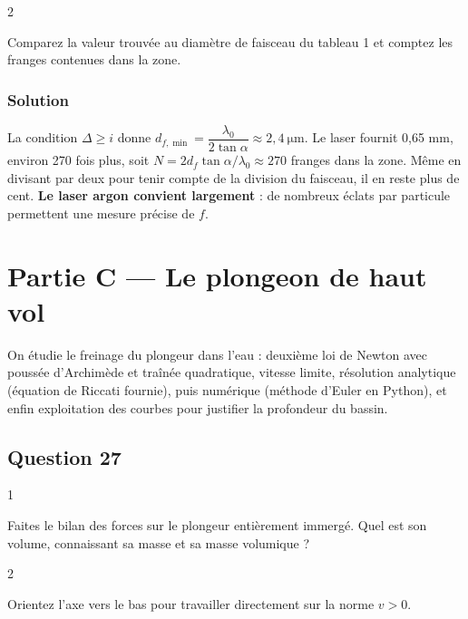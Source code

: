 \documentclass[11pt,a4paper]{article}
\begin{document}
\begin{indication}{2}

Comparez la valeur trouvée au diamètre de faisceau du tableau 1 et comptez les franges contenues dans la zone.

\end{indication}

\hypertarget{solution-25}{%
\subsubsection{Solution}\label{solution-25}}

La condition \(\Delta \ge i\) donne \(\boxed{d_{f,\min} = \dfrac{\lambda_0}{2\tan\alpha} \approx 2{,}4\ \mathrm{\mu m}}\). Le laser fournit 0,65 mm, environ 270 fois plus, soit \(N = 2 d_f\tan\alpha/\lambda_0 \approx 270\) franges dans la zone. Même en divisant par deux pour tenir compte de la division du faisceau, il en reste plus de cent. \textbf{Le laser argon convient largement} : de nombreux éclats par particule permettent une mesure précise de \(f\).

\hypertarget{partie-c-le-plongeon-de-haut-vol}{%
\section{Partie C --- Le plongeon de haut vol}\label{partie-c-le-plongeon-de-haut-vol}}

On étudie le freinage du plongeur dans l'eau : deuxième loi de Newton avec poussée d'Archimède et traînée quadratique, vitesse limite, résolution analytique (équation de Riccati fournie), puis numérique (méthode d'Euler en Python), et enfin exploitation des courbes pour justifier la profondeur du bassin.

\hypertarget{question-27}{%
\subsection{Question 27}\label{question-27}}

\begin{indication}{1}

Faites le bilan des forces sur le plongeur entièrement immergé. Quel est son volume, connaissant sa masse et sa masse volumique ?

\end{indication}

\begin{indication}{2}

Orientez l'axe vers le bas pour travailler directement sur la norme \(v > 0\).

\end{indication}
\end{document}
